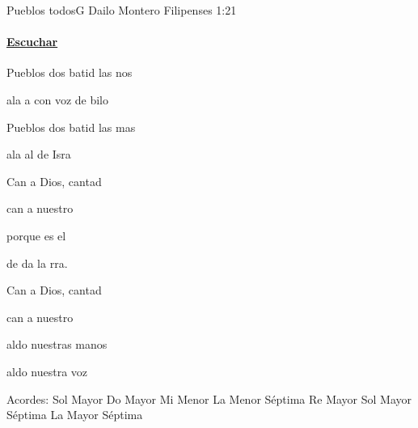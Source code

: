 \documentclass[12pt, spanish]{book}
\begin{document}
    \begin{song}{Pueblos todos}{G}
        {} %
        {Dailo Montero}
        {Filipenses 1:21} %
        {}
        \ifChordBk
        \paragraph{\mbox{}\hfill\protect\href{https://open.spotify.com/intl-es/track/0QOoX8FrCo3w85YES5pvCP}{Escuchar}\mbox{}\hfill}
        \fi

        \begin{SBOpGroup}
            Pueblos dos batid las nos

            ala a  con voz de bilo

            Pueblos dos batid las mas

            ala al  de Isra~
        \end{SBOpGroup}

        \begin{SBChorus}
            Can a Dios, cantad

            can a nuestro 

            porque  es el 

            de da la rra.


            Can a Dios, cantad

            can a nuestro 

            aldo nuestras manos

            aldo nuestra voz
        \end{SBChorus}

        \ifChordBk
        \begin{SBOpGroup}
            Acordes:
            \upchord{\G}\qquad Sol Mayor \hfill
            \upchord{\C}\qquad Do Mayor \hfill\null\break
            \upchord{\Em}\qquad Mi Menor \hfill
            \upchord{\Amseven}\qquad La Menor S\'eptima \hfill\null\break
            \upchord{\D}\qquad Re Mayor \hfill
            \upchord{\Gseven}Sol Mayor S\'eptima \hfill\null\break
            \upchord{\Aseven}\qquad La Mayor S\'eptima \hfill
        \end{SBOpGroup}
        \fi
    \end{song}
\end{document}

